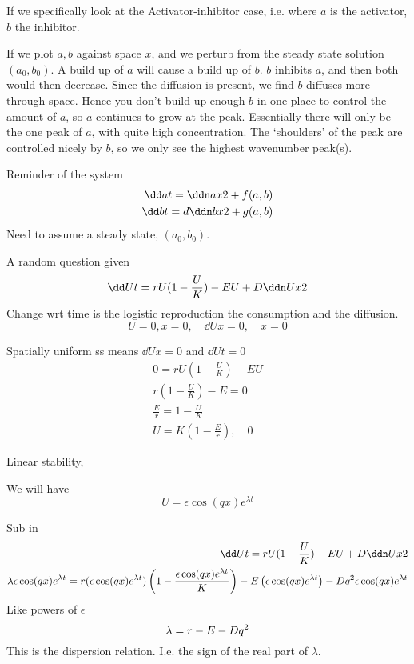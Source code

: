 \documentclass{X:/Documents/Coding/Latex/myassignment}
\begin{document}
If we specifically look at the Activator-inhibitor case, i.e. where $a$ is the activator, $b$ the inhibitor.

If we plot $a,b$ against space $x$, and we perturb from the steady state solution $(a_0,b_0)$. A build up of $a$ will cause a build up of $b$. $b$ inhibits $a$, and then both would then decrease. Since the diffusion is present, we find $b$ diffuses more through space. Hence you don't build up enough $b$ in one place to control the amount of $a$, so $a$ continues to grow at the peak. Essentially there will only be the one peak of $a$, with quite high concentration. The `shoulders' of the peak are controlled nicely by $b$, so we only see the highest wavenumber peak(s). 






Reminder of the system
\begin{align*}
	\dd at = \ddn ax2 + f(a,b)\\
	\dd bt = d \ddn bx2 + g(a,b)
\end{align*}
Need to assume a steady state, $(a_0,b_0)$.





A random question given
\[\dd Ut = rU(1- \frac UK) - EU + D \ddn Ux2\]
Change wrt time is the logistic reproduction the consumption and the diffusion.
\[U=0, x=0, \quad \dd Ux = 0, \quad x=0\]

Spatially uniform ss means $\dd Ux = 0$ and $\dd Ut = 0$
\begin{align*}
	0= r U (1-\frac UK) - EU \\
	r(1-\frac UK) - E = 0\\
	\frac Er = 1 - \frac UK\\
	U = K(1 - \frac Er), \quad 0
\end{align*}

Linear stability,

We will have
\[U = \epsilon \cos (qx) e^{\lambda t}\]

Sub in
\begin{align*}
	\dd Ut = rU(1- \frac UK) - EU + D \ddn Ux2\\
	\lambda \epsilon \cos (qx) e^{\lambda t} = r(\epsilon \cos (qx) e^{\lambda t}) \left(1 - \frac{\epsilon \cos (qx) e^{\lambda t}}{K}\right) - E\left(\epsilon \cos (qx) e^{\lambda t}\right) - D q^2\epsilon \cos (qx) e^{\lambda t}\\
\end{align*}
Like powers of $\epsilon$
\[
	\lambda= r - E - Dq^2\\
\]
This is the dispersion relation. I.e. the sign of the real part of $\lambda$.
\end{document}
